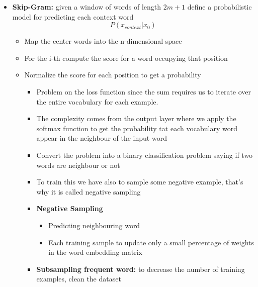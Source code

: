 \begin{itemize}
\begin{itemize}
    \end{itemize}
    \item \textbf{Skip-Gram:} given a window of words of length \(2m + 1\) define a probabilistic model for predicting each context word
    \[P(x_{context} | x_0)\]
    \begin{itemize}
        \item Map the center words into the n-dimensional space 
        \item For the i-th compute the score for a word occupying that position
        \item Normalize the score for each position to get a probability
        \begin{itemize}
            \item Problem on the loss function since the sum requires us to iterate over the entire vocabulary for each example.
            \item The complexity comes from the output layer where we apply the softmax function to get the probability tat each vocabulary word appear in the neighbour of the input word
            \item Convert the problem into a binary classification problem saying if two words are neighbour or not
            \item To train this we have also to sample some negative example, that's why it is called negative sampling
            \item \textbf{Negative Sampling}
            \begin{itemize}
                \item Predicting neighbouring word
                \item Each training sample to update only a small percentage of weights in the word embedding matrix 
            \end{itemize}
            \item \textbf{Subsampling frequent word:} to decrease the number of training examples, clean the dataset
        \end{itemize}
    \end{itemize}
\end{itemize}

